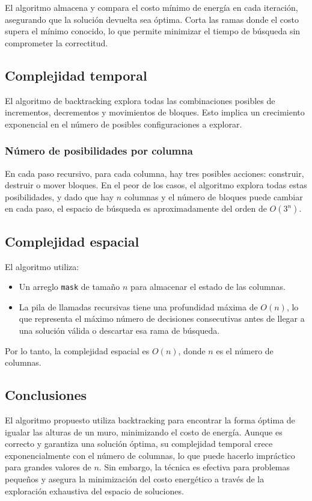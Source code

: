 \documentclass[a4paper,12pt]{article}
\begin{document}
El algoritmo almacena y compara el costo mínimo de energía en cada iteración, asegurando que la solución devuelta sea óptima. Corta las ramas donde el costo supera el mínimo conocido, lo que permite minimizar el tiempo de búsqueda sin comprometer la correctitud.

\subsection{Complejidad temporal}
El algoritmo de backtracking explora todas las combinaciones posibles de incrementos, decrementos y movimientos de bloques. Esto implica un crecimiento exponencial en el número de posibles configuraciones a explorar.

\subsubsection{Número de posibilidades por columna}
En cada paso recursivo, para cada columna, hay tres posibles acciones: construir, destruir o mover bloques. En el peor de los casos, el algoritmo explora todas estas posibilidades, y dado que hay \( n \) columnas y el número de bloques puede cambiar en cada paso, el espacio de búsqueda es aproximadamente del orden de \( O(3^n) \).

\subsection{Complejidad espacial}
El algoritmo utiliza:
\begin{itemize}
	\item Un arreglo \texttt{mask} de tamaño \( n \) para almacenar el estado de las columnas.
	\item La pila de llamadas recursivas tiene una profundidad máxima de \( O(n) \), lo que representa el máximo número de decisiones consecutivas antes de llegar a una solución válida o descartar esa rama de búsqueda.
\end{itemize}
Por lo tanto, la complejidad espacial es \( O(n) \), donde \( n \) es el número de columnas.

\subsection{Conclusiones}
El algoritmo propuesto utiliza backtracking para encontrar la forma óptima de igualar las alturas de un muro, minimizando el costo de energía. Aunque es correcto y garantiza una solución óptima, su complejidad temporal crece exponencialmente con el número de columnas, lo que puede hacerlo impráctico para grandes valores de \( n \). Sin embargo, la técnica es efectiva para problemas pequeños y asegura la minimización del costo energético a través de la exploración exhaustiva del espacio de soluciones.
\end{document}
